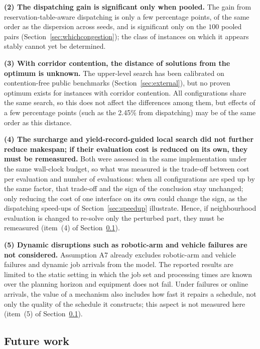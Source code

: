 \documentclass[manuscript,screen,review]{acmart}
\newcommand{\NPairs}{100}
\newcommand{\GainProbeLoop}{2.45\%}      %
\begin{document}
\textbf{(2) The dispatching gain is significant only when pooled.}
The gain from reservation-table-aware dispatching is only a few percentage points, of the same order as the dispersion across seeds, and is significant only on the $\NPairs$ pooled pairs (Section~\ref{sec:whichcongestion}); the class of instances on which it appears stably cannot yet be determined.

\textbf{(3) With corridor contention, the distance of solutions from the optimum is unknown.}
The upper-level search has been calibrated on contention-free public benchmarks (Section~\ref{sec:external}), but no proven optimum exists for instances with corridor contention. All configurations share the same search, so this does not affect the differences among them, but effects of a few percentage points (such as the \GainProbeLoop{} from dispatching) may be of the same order as this distance.

\textbf{(4) The surcharge and yield-record-guided local search did not further reduce makespan; if their evaluation cost is reduced on its own, they must be remeasured.}
Both were assessed in the same implementation under the same wall-clock budget, so what was measured is the trade-off between cost per evaluation and number of evaluations: when all configurations are sped up by the same factor, that trade-off and the sign of the conclusion stay unchanged; only reducing the cost of one interface on its own could change the sign, as the dispatching speed-ups of Section~\ref{sec:speedup} illustrate.
Hence, if neighbourhood evaluation is changed to re-solve only the perturbed part, they must be remeasured (item~(4) of Section~\ref{sec:future_work}).

\textbf{(5) Dynamic disruptions such as robotic-arm and vehicle failures are not considered.}
Assumption A7 already excludes robotic-arm and vehicle failures and dynamic job arrivals from the model. The reported results are limited to the static setting in which the job set and processing times are known over the planning horizon and equipment does not fail. Under failures or online arrivals, the value of a mechanism also includes how fast it repairs a schedule, not only the quality of the schedule it constructs; this aspect is not measured here (item~(5) of Section~\ref{sec:future_work}).

\subsection{Future work}
\label{sec:future_work}
\end{document}
